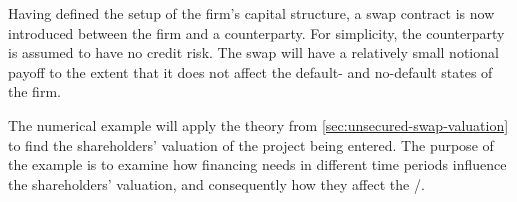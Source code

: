 \documentclass[main.tex]{subfiles}
\begin{document}
        Having defined the setup of the firm's capital structure,
        a swap contract is now introduced between the firm and a counterparty.
        For simplicity, the counterparty is assumed to have no credit risk.
        The swap will have a relatively small notional payoff to the extent
        that it does not affect the default- and no-default states of the firm.

        The numerical example will apply the theory from \cref{sec:unsecured-swap-valuation}
        to find the shareholders' valuation of the project being entered.
        The purpose of the example is to examine how financing needs
        in different time periods influence the shareholders' valuation,
        and consequently how they affect the \FVA/.
\end{document}
